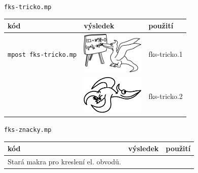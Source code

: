 \documentclass[a4paper,10pt]{article}
\begin{document}
{\centering\large\texttt{fks-tricko.mp}\nopagebreak\\\medskip}
\begin{tabularx}{\textwidth}{|l|l|X|}\hline
    kód & výsledek & použití\\\hline
    \verb+mpost fks-tricko.mp+ & \includegraphics[width=3cm]{fks-tricko_1} & 
	fks-tricko.1\\\hline
    & \includegraphics[width=3cm]{fks-tricko_2} & fks-tricko.2\\\hline
\end{tabularx}\bigskip

{\centering\large\texttt{fks-znacky.mp}\nopagebreak\\\medskip}
\begin{tabularx}{\textwidth}{|l|l|X|}\hline
    kód & výsledek & použití\\\hline
    Stará makra pro kreslení el. obvodů.&&\\\hline
\end{tabularx}\bigskip
\end{document}
